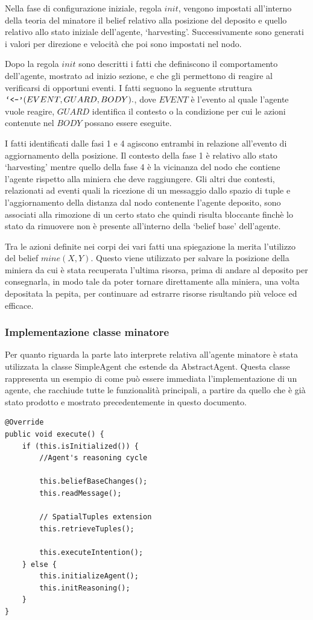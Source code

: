 Nella fase di configurazione iniziale, regola $init$, vengono impostati all'interno della teoria del minatore il belief relativo alla posizione del deposito e quello relativo allo stato iniziale dell'agente, `harvesting'. Successivamente sono generati i valori per direzione e velocità che poi sono impostati nel nodo.

Dopo la regola $init$ sono descritti i fatti che definiscono il comportamento dell'agente, mostrato ad inizio sezione, e che gli permettono di reagire al verificarsi di opportuni eventi.
I fatti seguono la seguente struttura $\text{\texttt{`<-'}}(EVENT, GUARD, BODY).$, dove $EVENT$ è l'evento al quale l'agente vuole reagire, $GUARD$ identifica il contesto o la condizione per cui le azioni contenute nel $BODY$ possano essere eseguite.

I fatti identificati dalle fasi 1 e 4 agiscono entrambi in relazione all'evento di aggiornamento della posizione. Il contesto della fase 1 è relativo allo stato `harvesting' mentre quello della fase 4 è la vicinanza del nodo che contiene l'agente rispetto alla miniera che deve raggiungere.
Gli altri due contesti, relazionati ad eventi quali la ricezione di un messaggio dallo spazio di tuple e l'aggiornamento della distanza dal nodo contenente l'agente deposito, sono associati alla rimozione di un certo stato che quindi risulta bloccante finchè lo stato da rimuovere non è presente all'interno della `belief base' dell'agente.

Tra le azioni definite nei corpi dei vari fatti una spiegazione la merita l'utilizzo del belief $mine(X,Y)$. Questo viene utilizzato per salvare la posizione della miniera da cui è stata recuperata l'ultima risorsa, prima di andare al deposito per consegnarla, in modo tale da poter tornare direttamente alla miniera, una volta depositata la pepita, per continuare ad estrarre risorse risultando più veloce ed efficace.

\subsubsection{Implementazione classe minatore}
Per quanto riguarda la parte lato interprete relativa all'agente minatore è stata utilizzata la classe SimpleAgent che estende da AbstractAgent. Questa classe rappresenta un esempio di come può essere immediata l'implementazione di un agente, che racchiude tutte le funzionalità principali, a partire da quello che è già stato prodotto e mostrato precedentemente in questo documento.

\switchToJava{}{}
\begin{lstlisting}[float,firstnumber=1,label={lst:SimpleAgentReasoningCycle},caption={Ciclo di ragionamento per l'agente completo}]
@Override
public void execute() {
    if (this.isInitialized()) {
        //Agent's reasoning cycle
        
        this.beliefBaseChanges();
        this.readMessage();

        // SpatialTuples extension
        this.retrieveTuples();

        this.executeIntention();
    } else {
        this.initializeAgent();
        this.initReasoning();
    }
}
\end{lstlisting}

